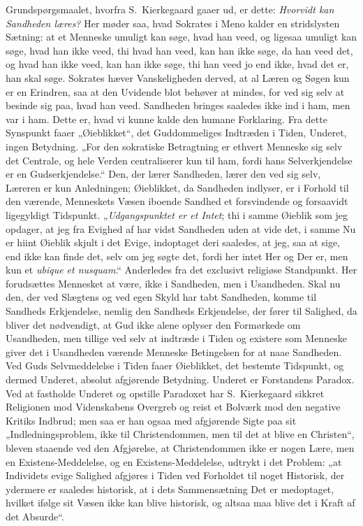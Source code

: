 \documentclass[12pt]{book}
\begin{document}
Grundspørgsmaalet, hvorfra S.\ Kierkegaard gaaer ud, er dette:
\emph{Hvorvidt kan Sandheden læres?} Her møder saa, hvad Sokrates i
Meno kalder en stridslysten Sætning: at et Menneske umuligt kan
søge, hvad han veed, og ligesaa umuligt kan søge, hvad han ikke
veed, thi hvad han veed, kan han ikke søge, da han veed det, og hvad
han ikke veed, kan han ikke søge, thi han veed jo end ikke, hvad det
er, han skal søge. Sokrates hæver Vanskeligheden derved, at al Læren
og Søgen kun er en Erindren, saa at den Uvidende blot behøver at
mindes, for ved sig selv at besinde sig paa, hvad han veed.
Sandheden bringes saaledes ikke ind i ham, men var i ham. Dette er,
hvad vi kunne kalde den humane Forklaring. Fra dette Synspunkt faaer
„Øieblikket“, det Guddommeliges Indtræden i Tiden, Underet, ingen
Betydning. „For den sokratiske Betragtning er ethvert Menneske sig
selv det Centrale, og hele Verden centraliserer kun til ham, fordi
hans Selverkjendelse er en Gudserkjendelse.“ Den, der lærer
Sandheden, lærer den ved sig selv, Læreren er kun Anledningen;
Øieblikket, da Sandheden indlyser, er i Forhold til den værende,
Menneskets Væsen iboende Sandhed et forsvindende og forsaavidt
ligegyldigt Tidspunkt. „\emph{Udgangspunktet er et Intet}; thi i
samme Øieblik som jeg opdager, at jeg fra Evighed af har vidst
Sandheden uden at vide det, i samme Nu er hiint Øieblik skjult i det
Evige, indoptaget deri saaledes, at jeg, saa at sige, end ikke kan
finde det, selv om jeg søgte det, fordi her intet Her og Der er, men
kun et \textit{ubique et nusquam}.“ Anderledes fra det exclusivt
religiøse Standpunkt. Her forudsættes Mennesket at være, ikke i
Sandheden, men i Usandheden. Skal nu den, der ved Slægtens og ved
egen Skyld har tabt Sandheden, komme til Sandheds Erkjendelse,
nemlig den Sandheds Erkjendelse,
der fører til Salighed, da bliver det nødvendigt, at Gud ikke alene
oplyser den Formørkede om Usandheden, men tillige ved selv at
indtræde i Tiden og existere som Menneske giver det i Usandheden
værende Menneske Betingelsen for at naae Sandheden. Ved Guds
Selvmeddelelse i Tiden faaer Øieblikket, det bestemte Tidspunkt, og
dermed Underet, absolut afgjørende Betydning. Underet er Forstandens
Paradox. Ved at fastholde Underet og opstille Paradoxet har
S.\ Kierkegaard sikkret Religionen mod Videnskabens Overgreb og
reist et Bolværk mod den negative Kritiks Indbrud; men saa er han
ogsaa med afgjørende Sigte paa sit „Indledningsproblem, ikke til
Christendommen, men til det at blive en Christen“, bleven staaende
ved den Afgjørelse, at Christendommen ikke er nogen Lære, men en
Existens-Meddelelse, og en Existens-Meddelelse, udtrykt i det
Problem: „at Individets evige Salighed afgjøres i Tiden ved
Forholdet til noget Historisk, der ydermere er saaledes historisk,
at i dets Sammensætning Det er medoptaget, hvilket ifølge sit Væsen
ikke kan blive historisk, og altsaa maa blive det i Kraft af det
Absurde“.
\end{document}

